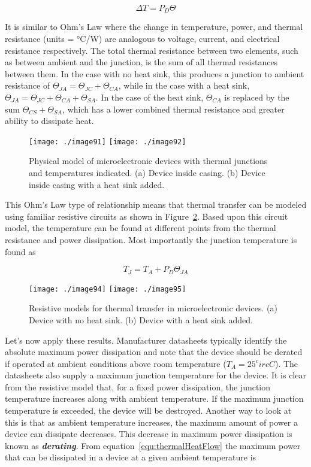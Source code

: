 {\begin{equation}
\label{equ:thermalHeatFlow}
\Delta T = P_D \Theta
\end{equation}

It is similar to Ohm's Law where the change in temperature, power, and
thermal resistance (units = °C/W) are analogous to voltage, current, and
electrical resistance respectively. The total thermal resistance between
two elements, such as between ambient and the junction, is the sum of
all thermal resistances between them. In the case with no heat sink,
this produces a junction to ambient resistance of
$\Theta_{JA} =  \Theta_{JC} + \Theta_{CA}$, while in the case with a heat
sink, 
$\Theta_{JA} = \Theta_{JC} + \Theta_{CA} + \Theta_{SA}$. In the case 
of the heat sink, $\Theta_{CA}$ is replaced by the sum
$\Theta_{CS} + \Theta_{SA}$, which has a lower combined
thermal resistance and greater ability to dissipate heat.

\begin{figure}
\texttt{[image: ./image91]}
\texttt{[image: ./image92]}
\caption{Physical model of microelectronic devices with
thermal junctions and temperatures indicated. (a) Device inside casing.
(b) Device inside casing with a heat sink added.}
\label{figure:thermalModelsBJT}
\end{figure}

This Ohm's Law type of relationship means that thermal transfer can be
modeled using familiar resistive circuits as shown in 
Figure~\ref{figure:thermalModelAsCircuit}. Based
upon this circuit model, the temperature can be found at different
points from the thermal resistance and power dissipation. Most
importantly the junction temperature is found as

\begin{equation}
\label{equ:thermalHeatFlow}
T_J = T_A + P_D \Theta_{JA}
\end{equation}

\begin{figure}
\texttt{[image: ./image94]}
\texttt{[image: ./image95]}
\caption{Resistive models for thermal transfer in
microelectronic devices. (a) Device with no heat sink. (b) Device with a
heat sink added.}
\label{figure:thermalModelAsCircuit}
\end{figure}

Let's now apply these results. Manufacturer datasheets typically
identify the absolute maximum power dissipation and note that the device
should be derated if operated at ambient conditions above room
temperature ($T_A = 25^circ C$). The datasheets
also supply a maximum junction temperature for the device. It is clear
from the resistive model that, for a fixed power dissipation, the
junction temperature increases along with ambient temperature. If the
maximum junction temperature is exceeded, the device will be destroyed.
Another way to look at this is that as ambient temperature increases,
the maximum amount of power a device can dissipate decreases. This
decrease in maximum power dissipation is known as
\emph{\textbf{derating}}. From equation~\ref{equ:thermalHeatFlow}
 the maximum power that can be
dissipated in a device at a given ambient temperature is

}
